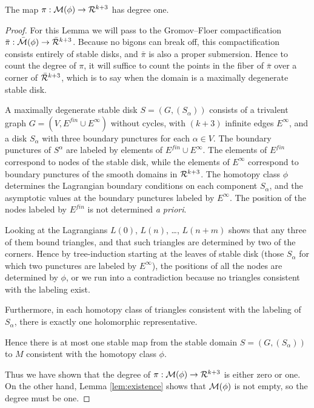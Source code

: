 \documentclass[12pt]{amsart}
\begin{document}
\begin{lemma}
  \label{lem:degree-1}
  The map $\pi: \mathcal{M}(\phi) \to \mathcal{R}^{k+3}$ has degree one.
\end{lemma}

\begin{proof}
  For this Lemma we will pass to the Gromov--Floer compactification
  $\bar{\pi}: \bar{\mathcal{M}}(\phi) \to \bar{\mathcal{R}}^{k+3}$. Because no bigons can
  break off, this compactification consists entirely of stable disks,
  and $\bar{\pi}$ is also a proper submersion. Hence to count the
  degree of $\pi$, it will suffice to count the points in the fiber of
  $\bar{\pi}$ over a corner of $\bar{\mathcal{R}}^{k+3}$, which is to say when
  the domain is a maximally degenerate stable disk.

  A maximally degenerate stable disk $S = (G, (S_\alpha))$ consists of a
  trivalent graph $G = (V,E^{fin} \cup E^\infty)$ without cycles, with
  $(k+3)$ infinite edges $E^\infty$, and a disk $S_\alpha$ with three
  boundary punctures for each $\alpha \in V$. The boundary punctures
  of $S^\alpha$ are labeled by elements of $E^{fin}\cup E^\infty$. The
  elements of $E^{fin}$ correspond to nodes of the stable disk, while
  the elements of $E^\infty$ correspond to boundary punctures of the
  smooth domains in $\mathcal{R}^{k+3}$. The homotopy class $\phi$ determines
  the Lagrangian boundary conditions on each component $S_\alpha$, and
  the asymptotic values at the boundary punctures labeled by
  $E^\infty$. The position of the nodes labeled by $E^{fin}$ is not
  determined \emph{a priori}.

  Looking at the Lagrangians $L(0)$, $L(n)$, \dots, $L(n+m)$ shows
  that any three of them bound triangles, and that such triangles are
  determined by two of the corners. Hence by tree-induction starting
  at the leaves of stable disk (those $S_\alpha$ for which two
  punctures are labeled by $E^\infty$), the positions of all the nodes
  are determined by $\phi$, or we run into a contradiction because no
  triangles consistent with the labeling exist.

  Furthermore, in each homotopy class of triangles consistent with the
  labeling of $S_\alpha$, there is exactly one holomorphic
  representative. 

  Hence there is at most one stable map from the stable domain $S =
  (G,(S_\alpha))$ to $M$ consistent with the homotopy class $\phi$.

  Thus we have shown that the degree of $\pi: \mathcal{M}(\phi) \to \mathcal{R}^{k+3}$ is either
  zero or one. On the other hand, Lemma \ref{lem:existence} shows that
  $\mathcal{M}(\phi)$ is not empty, so the degree must be one.
\end{proof}
\end{document}
